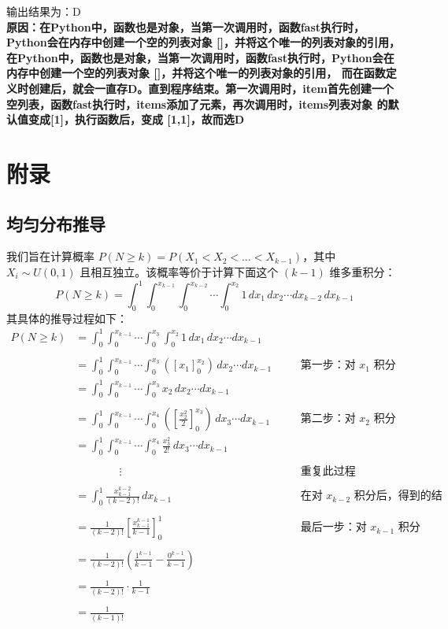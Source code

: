 \documentclass{article}
\begin{document}
输出结果为：D 
\\\textbf{原因：在Python中，函数也是对象，当第一次调用时，函数fast执行时，Python会在内存中创建一个空的列表对象 []，并将这个唯一的列表对象的引用，
在Python中，函数也是对象，当第一次调用时，函数fast执行时，Python会在内存中创建一个空的列表对象 []，并将这个唯一的列表对象的引用，
而在函数定义时创建后，就会一直存D。直到程序结束。第一次调用时，item首先创建一个空列表，函数fast执行时，items添加了元素，再次调用时，items列表对象
的默认值变成[1]，执行函数后，变成 [1,1]，故而选D}


\section{附录}
\subsection{均匀分布推导}
我们旨在计算概率 $P(N \ge k) = P(X_1 < X_2 < \dots < X_{k-1})$，其中 $X_i \sim U(0,1)$ 且相互独立。该概率等价于计算下面这个 $(k-1)$ 维多重积分：
$$ P(N \ge k) = \int_0^1 \int_0^{x_{k-1}} \int_0^{x_{k-2}} \cdots \int_0^{x_2} 1 \, dx_1 \, dx_2 \cdots dx_{k-2} \, dx_{k-1} $$
其具体的推导过程如下：
\begin{align*}
    P(N \ge k) &= \int_0^1 \int_0^{x_{k-1}} \cdots \int_0^{x_3} \int_0^{x_2} 1 \, dx_1 \, dx_2 \cdots dx_{k-1} \\
    \\
    &= \int_0^1 \int_0^{x_{k-1}} \cdots \int_0^{x_3} \left( [x_1]_0^{x_2} \right) \, dx_2 \cdots dx_{k-1} \quad &&\text{第一步：对 $x_1$ 积分} \\
    &= \int_0^1 \int_0^{x_{k-1}} \cdots \int_0^{x_3} x_2 \, dx_2 \cdots dx_{k-1} \\
    \\
    &= \int_0^1 \int_0^{x_{k-1}} \cdots \int_0^{x_4} \left( \left[ \frac{x_2^2}{2} \right]_0^{x_3} \right) \, dx_3 \cdots dx_{k-1} \quad &&\text{第二步：对 $x_2$ 积分} \\
    &= \int_0^1 \int_0^{x_{k-1}} \cdots \int_0^{x_4} \frac{x_3^2}{2!} \, dx_3 \cdots dx_{k-1} \\
    \\
    &\qquad\qquad \vdots \quad &&\text{重复此过程} \\
    \\
    &= \int_0^1 \frac{x_{k-1}^{k-2}}{(k-2)!} \, dx_{k-1} \quad &&\text{在对 $x_{k-2}$ 积分后，得到的结果}\\
    \\
    &= \frac{1}{(k-2)!} \left[ \frac{x_{k-1}^{k-1}}{k-1} \right]_0^1 \quad &&\text{最后一步：对 $x_{k-1}$ 积分} \\
    \\
    &= \frac{1}{(k-2)!} \left( \frac{1^{k-1}}{k-1} - \frac{0^{k-1}}{k-1} \right) \\
    \\
    &= \frac{1}{(k-2)!} \cdot \frac{1}{k-1} \\
    \\
    &= \frac{1}{(k-1)!}
    \end{align*}
\end{document}
